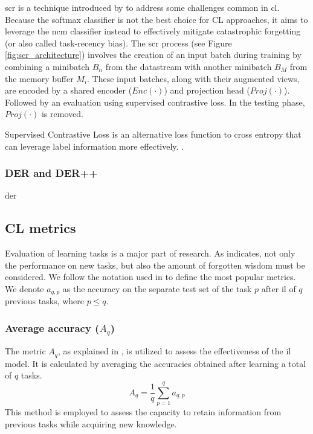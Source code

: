 \acrfull{scr} is a technique introduced by \citep{mai2021supervised} to address some challenges common in \acrshort{cl}. 
Because the softmax classifier is not the best choice for CL approaches, it aims to leverage the \acrfull{ncm} classifier instead to effectively mitigate catastrophic forgetting (or also called task-recency bias). 
The \acrshort{scr} process (see Figure \ref{fig:scr_architecture}) involves the creation of an input batch during training by combining a minibatch $B_{n}$ from the datastream with another minibatch $B_{M}$ from the memory buffer $M_{i}$. These input batches, along with their augmented views, are encoded by a shared encoder ($Enc(\cdot)$) and projection head ($Proj(\cdot)$). Followed by an evaluation using supervised contrastive loss. In the testing phase, $Proj(\cdot)$ is removed.


Supervised Contrastive Loss is an alternative loss function to cross entropy that can leverage label information more effectively. \citep{khosla2020supervised}.

\subsubsection{DER and DER++}
\acrfull{der} 

\subsection{CL metrics}
\label{sec:il_metrics}
Evaluation of learning tasks is a major part of research. As \citep{qu2021recent} indicates, not only the performance on new tasks, but also the amount of forgotten wisdom must be considered. We follow the notation used in \citep{diaz2018don, lopez2017gradient, chaudhry2018riemannian} to define the most popular metrics. \\
We denote $a_{q,p}$ as the accuracy on the separate test set of the task $p$ after \acrshort{il} of $q$ previous tasks, where $p\leq q$.

\subsubsection{Average accuracy ($A_{q}$)}
The metric $A_{q}$, as explained in \citep{wang2023comprehensive}, is utilized to assess the effectiveness of the \acrshort{il} model. It is calculated by averaging the accuracies obtained after learning a total of $q$ tasks. 
\begin{equation}
\label{metric:A_q}
    A_{q} = \frac{1}{q} \sum_{p=1}^{q} a_{q,p}
\end{equation}
This method is employed to assess the capacity to retain information from previous tasks while acquiring new knowledge.

